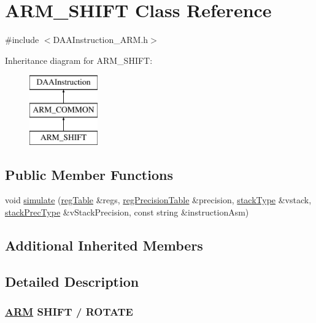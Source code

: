 \hypertarget{classARM__SHIFT}{}\section{A\+R\+M\+\_\+\+S\+H\+I\+FT Class Reference}
\label{classARM__SHIFT}


{\ttfamily \#include $<$D\+A\+A\+Instruction\+\_\+\+A\+R\+M.\+h$>$}

Inheritance diagram for A\+R\+M\+\_\+\+S\+H\+I\+FT\+:\begin{figure}[H]
\begin{center}
\leavevmode
\includegraphics[height=3.000000cm]{classARM__SHIFT}
\end{center}
\end{figure}
\subsection*{Public Member Functions}
\begin{DoxyCompactItemize}
\item 
void \hyperlink{classARM__SHIFT_a0438bca8496243c4067bb1ec24abeab4}{simulate} (\hyperlink{DAAInstruction_8h_af0fae93a861de9cf37988d5673cac523}{reg\+Table} \&regs, \hyperlink{DAAInstruction_8h_a0e8cae02815a5f8adc750122d790b455}{reg\+Precision\+Table} \&precision, \hyperlink{DAAInstruction_8h_a1b0e70ac1a04f06c8132055ed01f589f}{stack\+Type} \&vstack, \hyperlink{DAAInstruction_8h_ac5cb793e9dac3fa9693da78b7e29ab30}{stack\+Prec\+Type} \&v\+Stack\+Precision, const string \&instruction\+Asm)
\end{DoxyCompactItemize}
\subsection*{Additional Inherited Members}


\subsection{Detailed Description}


 \subsubsection*{\hyperlink{classARM}{A\+RM} S\+H\+I\+FT / R\+O\+T\+A\+TE }

